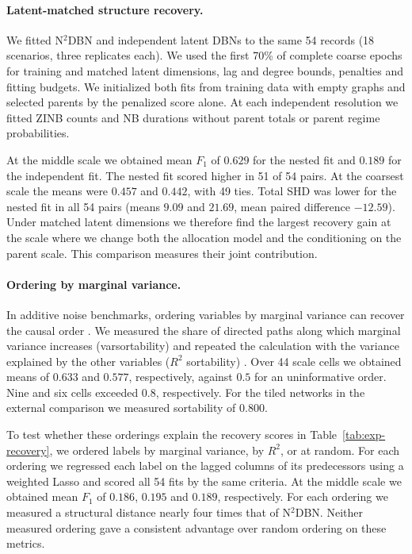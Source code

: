 \documentclass[sigconf]{acmart}
\begin{document}
\paragraph{Latent-matched structure recovery.} We fitted N$^2$DBN and independent latent DBNs to the same 54 records (18 scenarios, three replicates each). We used the first 70\% of complete coarse epochs for training and matched latent dimensions, lag and degree bounds, penalties and fitting budgets. We initialized both fits from training data with empty graphs and selected parents by the penalized score alone. At each independent resolution we fitted ZINB counts and NB durations without parent totals or parent regime probabilities.

At the middle scale we obtained mean \(F_1\) of \(0.629\) for the nested fit and \(0.189\) for the independent fit. The nested fit scored higher in 51 of 54 pairs. At the coarsest scale the means were \(0.457\) and \(0.442\), with 49 ties. Total SHD was lower for the nested fit in all 54 pairs (means \(9.09\) and \(21.69\), mean paired difference \(-12.59\)). Under matched latent dimensions we therefore find the largest recovery gain at the scale where we change both the allocation model and the conditioning on the parent scale. This comparison measures their joint contribution.

\paragraph{Ordering by marginal variance.} In additive noise benchmarks, ordering variables by marginal variance can recover the causal order \citep{reisach_beware_2021}. We measured the share of directed paths along which marginal variance increases (varsortability) and repeated the calculation with the variance explained by the other variables (\(R^2\) sortability) \citep{reisach_scale_2023,lohse_sortability_2025}. Over 44 scale cells we obtained means of \(0.633\) and \(0.577\), respectively, against \(0.5\) for an uninformative order. Nine and six cells exceeded \(0.8\), respectively. For the tiled networks in the external comparison we measured sortability of \(0.800\).

To test whether these orderings explain the recovery scores in Table~\ref{tab:exp-recovery}, we ordered labels by marginal variance, by \(R^2\), or at random. For each ordering we regressed each label on the lagged columns of its predecessors using a weighted Lasso and scored all 54 fits by the same criteria. At the middle scale we obtained mean \(F_1\) of \(0.186\), \(0.195\) and \(0.189\), respectively. For each ordering we measured a structural distance nearly four times that of N$^2$DBN. Neither measured ordering gave a consistent advantage over random ordering on these metrics.
\end{document}
